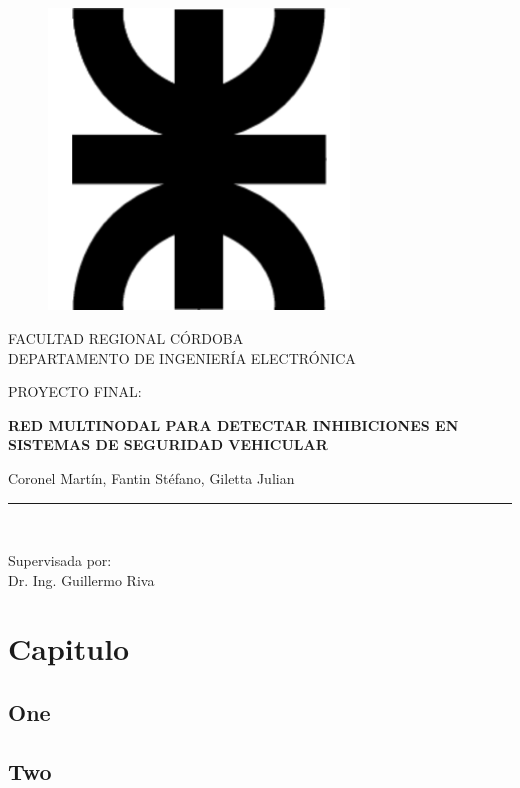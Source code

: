\documentclass[12pt]{report}
\begin{document}
\begin{titlepage}

    \begin{center}
    \vspace*{-1in}
    \begin{figure}[htb]
    \begin{center}
    \includegraphics[width=8cm]{LogoUTN.png}
    \end{center}
    \end{figure}
    
    FACULTAD REGIONAL CÓRDOBA\\
    \vspace*{0.15in}
    DEPARTAMENTO DE INGENIERÍA ELECTRÓNICA \\
    \vspace*{0.6in}
    \begin{large}
    PROYECTO FINAL:\\
    \end{large}
    \vspace*{0.2in}
    \begin{Large}
    \textbf{RED MULTINODAL PARA DETECTAR INHIBICIONES EN SISTEMAS DE SEGURIDAD VEHICULAR} \\
    \end{Large}
    \vspace*{0.3in}
    \begin{large}
    Coronel Martín, Fantin Stéfano, Giletta Julian\\
    \end{large}
    \vspace*{0.3in}
    \rule{80mm}{0.1mm}\\
    \vspace*{0.1in}
    \begin{large}
    Supervisada por: \\
    Dr. Ing. Guillermo Riva \\
    \end{large}
    \end{center}
    
\end{titlepage}




\tableofcontents

\cleardoublepage
{}
\section{Capitulo}
\subsection{One}
\pagebreak
\subsection{Two}
\end{document}
